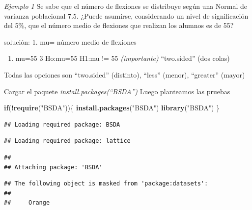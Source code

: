\documentclass[
]{article}
\newenvironment{Shaded}{\begin{snugshade}}{\end{snugshade}}
\newcommand{\AttributeTok}[1]{\textcolor[rgb]{0.13,0.29,0.53}{#1}}
\newcommand{\ConstantTok}[1]{\textcolor[rgb]{0.56,0.35,0.01}{#1}}
\newcommand{\ControlFlowTok}[1]{\textcolor[rgb]{0.13,0.29,0.53}{\textbf{#1}}}
\newcommand{\DecValTok}[1]{\textcolor[rgb]{0.00,0.00,0.81}{#1}}
\newcommand{\FloatTok}[1]{\textcolor[rgb]{0.00,0.00,0.81}{#1}}
\newcommand{\FunctionTok}[1]{\textcolor[rgb]{0.13,0.29,0.53}{\textbf{#1}}}
\newcommand{\NormalTok}[1]{#1}
\newcommand{\SpecialCharTok}[1]{\textcolor[rgb]{0.81,0.36,0.00}{\textbf{#1}}}
\newcommand{\StringTok}[1]{\textcolor[rgb]{0.31,0.60,0.02}{#1}}
\providecommand{\tightlist}{%
  \setlength{\itemsep}{0pt}\setlength{\parskip}{0pt}}
\begin{document}
\emph{Ejemplo 1 } Se sabe que el número de flexiones se distribuye según
una Normal de varianza poblacional 7.5. ¿Puede asumirse, considerando un
nivel de significación del 5\%, que el número medio de flexiones que
realizan los alumnos es de 55?

solución: 1. mu= número medio de flexiones

\begin{enumerate}
\def\labelenumi{\arabic{enumi}.}
\setcounter{enumi}{1}
\tightlist
\item
  mu=55 3 Ho:mu=55 H1:mu != 55 \emph{(importante)} ``two.sided'' (dos
  colas)
\end{enumerate}

Todas las opciones son ``two.sided'' (distinto), ``less'' (menor),
``greater'' (mayor)

Cargar el paquete \emph{install.packages(``BSDA'')} Luego planteamos las
pruebas

\begin{Shaded}
\begin{Highlighting}[]
\ControlFlowTok{if}\NormalTok{(}\SpecialCharTok{!}\FunctionTok{require}\NormalTok{(}\StringTok{"BSDA"}\NormalTok{))\{}
\FunctionTok{install.packages}\NormalTok{(}\StringTok{"BSDA"}\NormalTok{)}
\FunctionTok{library}\NormalTok{(}\StringTok{"BSDA"}\NormalTok{)}
\NormalTok{\}}
\end{Highlighting}
\end{Shaded}

\begin{verbatim}
## Loading required package: BSDA
\end{verbatim}

\begin{verbatim}
## Loading required package: lattice
\end{verbatim}

\begin{verbatim}
## 
## Attaching package: 'BSDA'
\end{verbatim}

\begin{verbatim}
## The following object is masked from 'package:datasets':
## 
##     Orange
\end{verbatim}

\begin{Shaded}
\end{Shaded}
\end{document}

